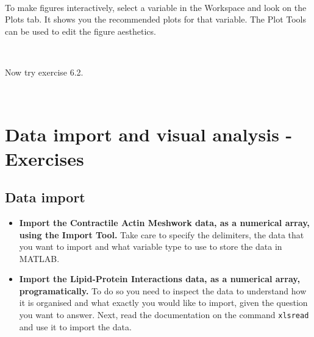 \documentclass[11pt]{amsart}
\begin{document}
\

To make figures interactively, select a variable in the Workspace and look on the Plots tab. It shows you the recommended plots for that variable. The Plot Tools can be used to edit the figure aesthetics.

\

Now try exercise 6.2.

\

\section{Data import and visual analysis - Exercises}


\subsection{Data import}
\begin{itemize}
\item {\bf Import the Contractile Actin Meshwork data, as a numerical array, using the Import Tool.} Take care to specify the delimiters, the data that you want to import and what variable type to use to store the data in MATLAB. 

\item {\bf Import the Lipid-Protein Interactions data, as a numerical array, programatically.} To do so you need to inspect the data to understand how it is organised and what exactly you would like to import, given the question you want to answer. Next, read the documentation on the command \verb+xlsread+ and use it to import the data.
\end{itemize}
\end{document}
